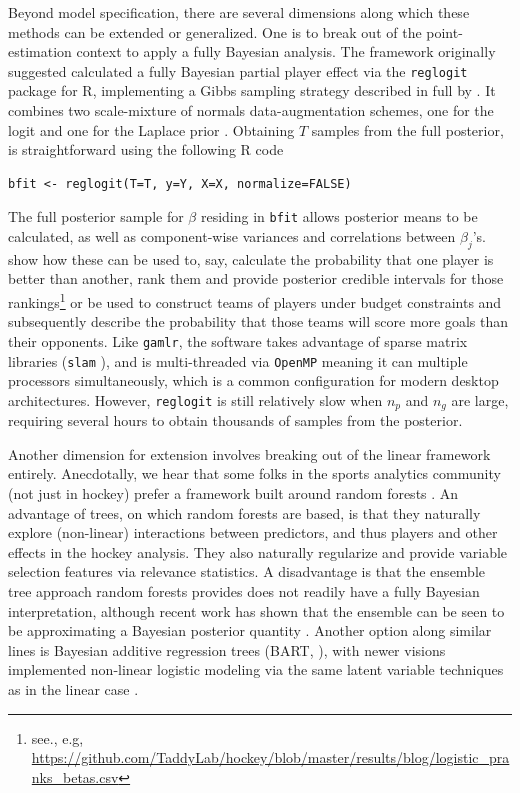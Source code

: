 Beyond model specification, there are several dimensions along which these
methods can be extended or generalized.  One is to break out of the
point-estimation context to apply a fully Bayesian analysis. The framework
originally suggested \cite{gramacy:jensen:taddy:2013} calculated a fully
Bayesian partial player effect via the {\tt reglogit} package for {\sf R},
implementing a Gibbs sampling strategy
\cite{gem:gem:1984} described in full by \cite{gra:pols:2012}.  It combines
two scale-mixture of normals data-augmentation schemes, one for the logit
\cite{holmes:held:2006} and one for the Laplace prior \cite{park:casella:2008}.
Obtaining $T$ samples from the full posterior, is straightforward using the
following {\sf R} code
\begin{verbatim}
bfit <- reglogit(T=T, y=Y, X=X, normalize=FALSE)
\end{verbatim}
The full posterior sample for $\beta$ residing in {\tt bfit} allows posterior
means to be calculated, as well as component-wise variances and correlations
between $\beta_j$'s.  \cite{gramacy:jensen:taddy:2013} show how these can be
used to, say, calculate the probability that one player is better than
another, rank them and provide posterior credible intervals for those
rankings\footnote{see., e.g, 
\url{https://github.com/TaddyLab/hockey/blob/master/results/blog/logistic_pranks_betas.csv}
} or be used to construct teams of players under budget constraints and
subsequently describe the probability that those teams will score more goals
than their opponents.  Like {\tt gamlr}, the software takes advantage of
sparse matrix libraries ({\tt slam} \cite{slam}), and is multi-threaded via
{\tt OpenMP} meaning it can multiple processors simultaneously, which is a
common configuration for modern desktop architectures. However, {\tt reglogit}
is still relatively slow when $n_p$ and $n_g$ are large, requiring several
hours to obtain thousands of samples from the posterior.

Another dimension for extension involves breaking out of the linear framework
entirely.  Anecdotally, we hear that some folks in the sports analytics
community (not just in hockey) prefer a framework built around random forests
\cite{breiman:2001}.  An advantage of trees, on which random forests are based,
is that they naturally explore (non-linear) interactions between predictors,
and thus players and other effects in the hockey analysis.  They also naturally
regularize and provide variable selection features via relevance statistics.  
A disadvantage is that the ensemble tree approach random forests provides does
not readily have a fully Bayesian interpretation, although recent work has 
shown that the ensemble can be seen to be approximating a Bayesian posterior
quantity \cite{taddy:eta:2015}.  Another option along similar lines is Bayesian
additive regression trees (BART, \cite{ChipGeorMcCu2010}), with newer visions
implemented non-linear logistic modeling via the same latent variable
techniques as in the linear case \cite{gra:pols:2012}.


